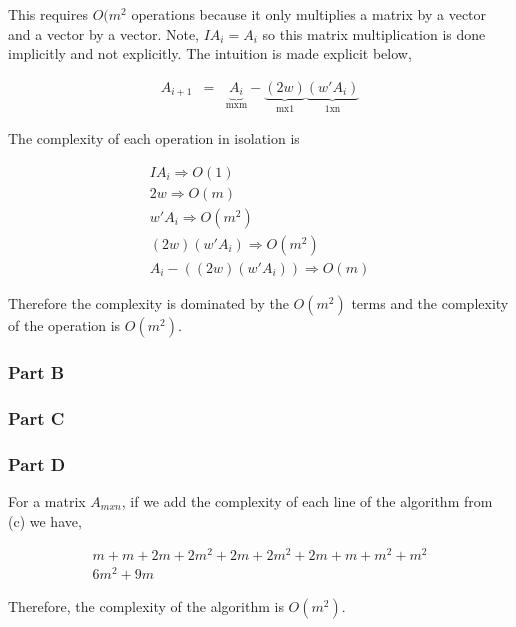 This requires \(O(m^{2}\) operations because it only multiplies a matrix by a vector and a vector by a vector.
Note, \(IA_i = A_i\) so this matrix multiplication is done implicitly and not explicitly.
The intuition is made explicit below,

\begin{eqnarray}
  A_{i+1} &=& \underbrace{A_i}_{\text{mxm}} - \underbrace{(2w)}_{\text{mx1}}\underbrace{(w'A_i)}_{\text{1xn}}
\end{eqnarray}

The complexity of each operation in isolation is

\begin{eqnarray}
  IA_i \Rightarrow O(1) \\
  2w \Rightarrow O(m) \\
  w'A_i \Rightarrow O(m^{2}) \\
  (2w)(w'A_i) \Rightarrow O(m^{2}) \\
  A_i - ((2w)(w'A_i)) \Rightarrow O(m)
\end{eqnarray}

Therefore the complexity is dominated by the \(O(m^{2})\) terms and the complexity of the operation is \(O(m^{2})\).

\newpage
\subsubsection{Part B}


\subsubsection{Part C}



\subsubsection{Part D}

For a matrix \(A_{mxn}\), if we add the complexity of each line of the algorithm from (c) we have,

\begin{eqnarray}
  m+m+2m+2m^{2}+2m+2m^{2}+2m+m+m^{2}+m^{2} \\
  \boxed{6m^{2}+9m}
\end{eqnarray}

Therefore, the complexity of the algorithm is \(O(m^{2})\).

